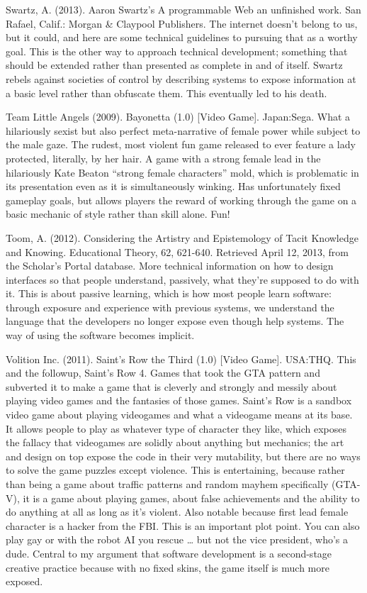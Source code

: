 Swartz, A. (2013). Aaron Swartz's A programmable Web an unfinished work. San Rafael, Calif.: Morgan & Claypool Publishers.
	The internet doesn’t belong to us, but it could, and here are some technical guidelines to pursuing that as a worthy goal. This is the other way to approach technical development; something that should be extended rather than presented as complete in and of itself. Swartz rebels against societies of control by describing systems to expose information at a basic level rather than obfuscate them. This eventually led to his death.

Team Little Angels (2009). Bayonetta (1.0) [Video Game]. Japan:Sega.
	What a hilariously sexist but also perfect meta-narrative of female power while subject to the male gaze. The rudest, most violent fun game released to ever feature a lady protected, literally, by her hair. A game with a strong female lead in the hilariously Kate Beaton “strong female characters” mold, which is problematic in its presentation even as it is simultaneously winking. Has unfortunately fixed gameplay goals, but allows players the reward of working through the game on a basic mechanic of style rather than skill alone. Fun!

Toom, A. (2012). Considering the Artistry and Epistemology of Tacit Knowledge and Knowing. Educational 
	Theory, 62, 621-640. Retrieved April 12, 2013, from the 	Scholar's Portal database.
	More technical information on how to design interfaces so that people understand, passively, what they’re supposed to do with it. This is about passive learning, which is how most people learn software: through exposure and experience with previous systems, we understand the language that the developers no longer expose even though help systems. The way of using the software becomes implicit.

Volition Inc. (2011). Saint’s Row the Third (1.0) [Video Game]. USA:THQ.
	This and the followup, Saint’s Row 4. Games that took the GTA pattern and subverted it to make a game that is cleverly and strongly and messily about playing video games and the fantasies of those games. Saint’s Row is a sandbox video game about playing videogames and what a videogame means at its base. It allows people to play as whatever type of character they like, which exposes the fallacy that videogames are solidly about anything but mechanics; the art and design on top expose the code in their very mutability, but there are no ways to solve the game puzzles except violence. This is entertaining, because rather than being a game about traffic patterns and random mayhem specifically (GTA-V), it is a game about playing games, about false achievements and the ability to do anything at all as long as it’s violent. Also notable because first lead female character is a hacker from the FBI. This is an important plot point. You can also play gay or with the robot AI you rescue … but not the vice president, who’s a dude. Central to my argument that software development is a second-stage creative practice because with no fixed skins, the game itself is much more exposed. 